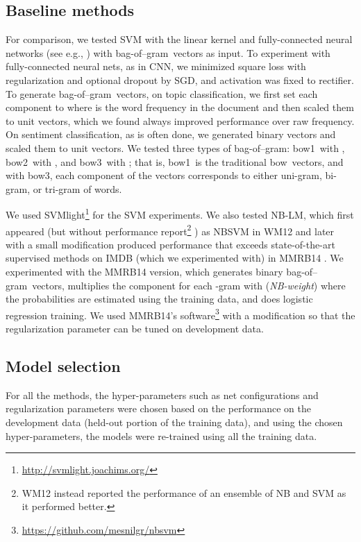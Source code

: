 \documentclass[11pt,letterpaper]{article}
\makeatletter
\newcommand{\cnn}{CNN}
\newcommand{\bow}{{bow}}
\newcommand{\bowone}{{bow1}}
\newcommand{\bowtwo}{{bow2}}
\newcommand{\bowthree}{{bow3}}
\newcommand{\bongram}{bag-of--gram}
\newcommand{\nbw}{NB-LM}
\newcommand\tightpara{\@startsection{paragraph}{4}{\z@}{1ex plus
   0ex minus 0.2ex}{-1em}{\normalsize\bf}}
\makeatother
\begin{document}
\subsection{Baseline methods} 
For comparison, we tested SVM
with the linear kernel and 
fully-connected neural networks
(see e.g., )
with \bongram\ vectors as input.  
To experiment with fully-connected neural nets, 
as in \cnn, we minimized square loss 
with  regularization 
and optional dropout
by SGD, and activation was fixed 
to rectifier.  
To generate \bongram\ vectors, 
on topic classification, 
we first set each component to  
where  is the word frequency in the document and then scaled them to unit vectors, 
which we found always improved performance over raw frequency.  
On sentiment classification, as is often done, we generated binary vectors and scaled them 
to unit vectors. 
We tested three types of \bongram: 
\bowone\ with , \bowtwo\ with , and \bowthree\ with ; 
that is, \bowone\ is the traditional \bow\ vectors, and 
with \bowthree, each component of the vectors corresponds to either uni-gram, bi-gram, 
or tri-gram of words.  




We used SVMlight\footnote{
  \url{http://svmlight.joachims.org/}
}
for the SVM experiments.  
\tightpara{\nbw}
We also tested \nbw, which first appeared (but without performance report\footnote{
  WM12 instead reported the performance of an ensemble of NB and SVM as it performed better.  
}
) as NBSVM in WM12 \cite{WM12} and later with a small modification 
produced 
performance that exceeds state-of-the-art supervised methods 
on IMDB (which we experimented with) 
in MMRB14 \cite{MMRB14}.  
We experimented with the MMRB14 version, which 
generates binary \bongram\ vectors, multiplies the component 
for each -gram  with 
({\em NB-weight}) where the probabilities are estimated using the training data, 
and does logistic regression training.  
We used MMRB14's software\footnote{
  \url{https://github.com/mesnilgr/nbsvm}
} with a modification so that the regularization parameter
can be tuned on development data.  

\subsection{Model selection}
\label{sec:protocol}
For all the methods, 
the hyper-parameters such as net configurations and 
regularization parameters were chosen 
based on the performance on the development data (held-out portion of the training data), 
and using the chosen hyper-parameters, the models were re-trained using all the training 
data.   
\end{document}
